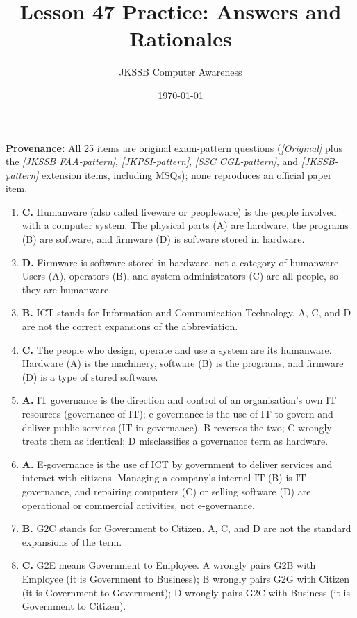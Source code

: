 \documentclass[11pt]{article}
\title{Lesson 47 Practice: Answers and Rationales}
\author{JKSSB Computer Awareness}
\date{\today}
\begin{document}
\maketitle
\noindent\textbf{Provenance:} All 25 items are original exam-pattern questions (\textit{[Original]} plus the \textit{[JKSSB FAA-pattern]}, \textit{[JKPSI-pattern]}, \textit{[SSC CGL-pattern]}, and \textit{[JKSSB-pattern]} extension items, including MSQs); none reproduces an official paper item.
\begin{enumerate}[label=\textbf{Q\arabic*.}, leftmargin=*]
\item \textbf{C.} Humanware (also called liveware or peopleware) is the people
  involved with a computer system. The physical parts (A) are hardware, the
  programs (B) are software, and firmware (D) is software stored in hardware.
\item \textbf{D.} Firmware is software stored in hardware, not a category of
  humanware. Users (A), operators (B), and system administrators (C) are all
  people, so they are humanware.
\item \textbf{B.} ICT stands for Information and Communication Technology. A,
  C, and D are not the correct expansions of the abbreviation.
\item \textbf{C.} The people who design, operate and use a system are its
  humanware. Hardware (A) is the machinery, software (B) is the programs, and
  firmware (D) is a type of stored software.
\item \textbf{A.} IT governance is the direction and control of an
  organisation's own IT resources (governance of IT); e-governance is the use
  of IT to govern and deliver public services (IT in governance). B reverses
  the two; C wrongly treats them as identical; D misclassifies a governance
  term as hardware.
\item \textbf{A.} E-governance is the use of ICT by government to deliver
  services and interact with citizens. Managing a company's internal IT (B) is
  IT governance, and repairing computers (C) or selling software (D) are
  operational or commercial activities, not e-governance.
\item \textbf{B.} G2C stands for Government to Citizen. A, C, and D are not
  the standard expansions of the term.
\item \textbf{C.} G2E means Government to Employee. A wrongly pairs G2B with
  Employee (it is Government to Business); B wrongly pairs G2G with Citizen
  (it is Government to Government); D wrongly pairs G2C with Business (it is
  Government to Citizen).

\end{enumerate}
\end{document}
